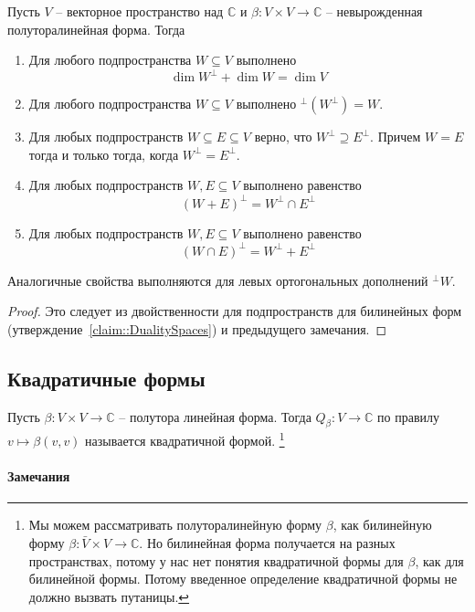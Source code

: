 \begin{claim}
Пусть $V$ -- векторное пространство над $\mathbb C$ и $\beta \colon V\times V\to \mathbb C$ -- невырожденная полуторалинейная форма.
Тогда
\begin{enumerate}
\item Для любого подпространства $W\subseteq V$ выполнено
\[
\dim W^\bot + \dim W = \dim V
\]

\item Для любого подпространства $W\subseteq V$ выполнено ${}^\bot(W^\bot) = W$.

\item Для любых подпространств $W\subseteq E\subseteq V$ верно, что $W^\bot \supseteq E^\bot$.
Причем $W = E$ тогда и только тогда, когда $W^\bot = E^\bot$.

\item Для любых подпространств $W, E\subseteq V$ выполнено равенство
\[
(W + E)^\bot = W^\bot \cap E^\bot
\]

\item Для любых подпространств $W, E\subseteq V$ выполнено равенство
\[
(W\cap E)^\bot = W^\bot + E^\bot
\]
\end{enumerate}
Аналогичные свойства выполняются для левых ортогональных дополнений ${}^\bot W$.
\end{claim}
\begin{proof}
Это следует из двойственности для подпространств для билинейных форм (утверждение~\ref{claim::DualitySpaces}) и предыдущего замечания.
\end{proof}

\subsection{Квадратичные формы}

\begin{definition}
Пусть $\beta\colon V\times V\to \mathbb C$ -- полутора линейная форма.
Тогда $Q_\beta\colon V\to \mathbb C$ по правилу $v\mapsto \beta(v,v)$ называется квадратичной формой.%
\footnote{Мы можем рассматривать полуторалинейную форму $\beta$, как билинейную форму $\beta\colon \bar V\times V\to \mathbb C$.
Но билинейная форма получается на разных пространствах, потому у нас нет понятия квадратичной формы для $\beta$, как для билинейной формы.
Потому введенное определение квадратичной формы не должно вызвать путаницы.}
\end{definition}

\paragraph{Замечания}

